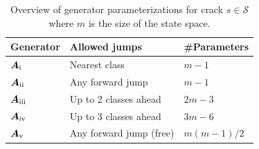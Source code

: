 \documentclass{article}
\newcommand{\RN}[1]{\textup{\uppercase\expandafter{\romannumeral#1}}}
\providecommand{\DIFdelbegin}{} %
\begin{document}
\begin{table}[htb!]
\centering
\caption{Overview of generator parameterizations for crack $s \in \mathcal{S}$ where $m$ is the size of the state space.}
\label{tab:generators_overview}
\begin{tabular}{@{}lll@{}}
\toprule
Generator & Allowed jumps & \#Parameters \\%
\midrule
$\bm{A}_{\RN{1}}$ & Nearest class & $m - 1$ \\%
$\bm{A}_{\RN{2}}$ & Any forward jump & $m - 1$ \\%
$\bm{A}_{\RN{3}}$ & Up to 2 classes ahead & $2m - 3$ \\%
$\bm{A}_{\RN{4}}$ & Up to 3 classes ahead & $3m - 6$ \\%
$\bm{A}_{\RN{5}}$ & Any forward jump (free) & $m(m-1)/2$ \\%
\bottomrule
\end{tabular}
\end{table}

\DIFdelbegin %
\end{document}
